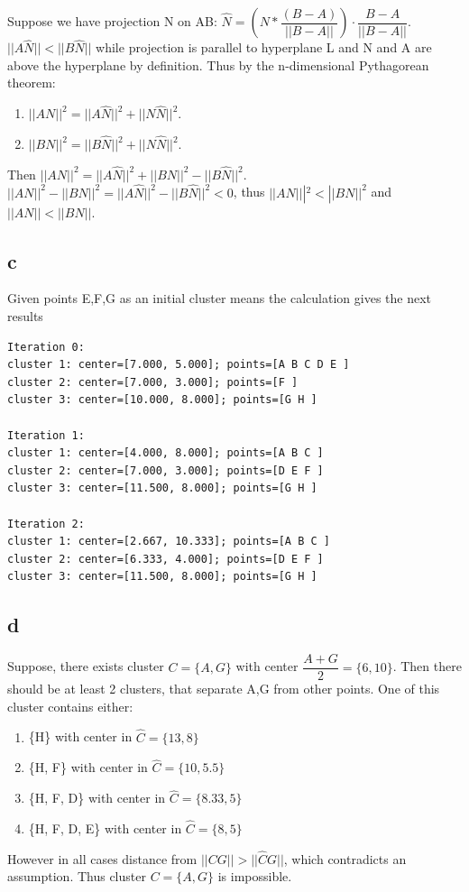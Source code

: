 Suppose we have projection N on AB: $\hat{N} = (N * \dfrac{(B-A)}{||B-A||}) \cdot \dfrac{B-A}{||B-A||}$.
$||A\hat{N}|| < ||B\hat{N}||$ while projection is parallel to hyperplane L and N and A are above the hyperplane by definition.
Thus by the n-dimensional Pythagorean theorem: 
\begin{enumerate}
	\item $||AN||^2 = ||A\hat{N}||^2 + ||N\hat{N}||^2$. 
	\item $||BN||^2 = ||B\hat{N}||^2 + ||N\hat{N}||^2$.
\end{enumerate} 
Then $||AN||^2 = ||A\hat{N}||^2 + ||BN||^2 -||B\hat{N}||^2$.
$||AN||^2 - ||BN||^2 = ||A\hat{N}||^2  - ||B\hat{N}||^2 < 0$, thus $||AN|||^2 < ||BN||^2$ and $||AN|| < ||BN||$.
\newpage
\subsection*{c}
Given points E,F,G as an initial cluster means the calculation gives the next results
\begin{verbatim}
Iteration 0:
cluster 1: center=[7.000, 5.000]; points=[A B C D E ]
cluster 2: center=[7.000, 3.000]; points=[F ]
cluster 3: center=[10.000, 8.000]; points=[G H ]

Iteration 1:
cluster 1: center=[4.000, 8.000]; points=[A B C ]
cluster 2: center=[7.000, 3.000]; points=[D E F ]
cluster 3: center=[11.500, 8.000]; points=[G H ]

Iteration 2:
cluster 1: center=[2.667, 10.333]; points=[A B C ]
cluster 2: center=[6.333, 4.000]; points=[D E F ]
cluster 3: center=[11.500, 8.000]; points=[G H ]
\end{verbatim}
\newpage
\subsection*{d}
Suppose, there exists cluster $C=\{A,G\}$ with center $\dfrac{A+G}{2} = \{6,10\}$.
Then there should be at least 2 clusters, that separate A,G from other points.
One of this cluster contains either:
\begin{enumerate}
	\item \{H\} with center in $\hat{C}=\{13,8\}$
	\item \{H, F\} with center in $\hat{C}=\{10,5.5\}$
	\item \{H, F, D\} with center in $\hat{C}=\{8.33, 5\}$
	\item \{H, F, D, E\} with center in $\hat{C}=\{8,5\}$
\end{enumerate}

However in all cases distance from $||CG|| > ||\hat{C}G||$, which contradicts an assumption.
Thus cluster $C=\{A,G\}$ is impossible.